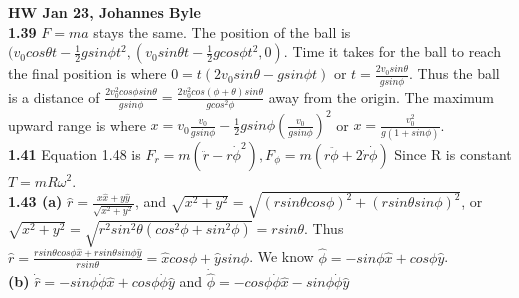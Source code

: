 \documentclass[english]{article}
\begin{document}
\textbf{HW Jan 23, Johannes Byle}\\

\noindent
\textbf{1.39} $F=ma$ stays the same. The position of the ball is $(v_{0}cos\theta t-\frac{1}{2}gsin\phi t^2,(v_{0}sin\theta t-\frac{1}{2}gcos\phi t^2,0)$. Time it takes for the ball to reach the final position is where $0=t(2v_{0}sin\theta-gsin\phi t)$ or $t=\frac{2v_{0}sin\theta}{gsin\phi}$. Thus the ball is a distance of $\frac{2v_0^2cos\phi sin\theta}{gsin\phi}=\frac{2v_0^2cos(\phi+\theta) sin\theta}{gcos^2\phi}$ away from the origin. The maximum upward range is where $x=v_{0}\frac{v_{0}}{gsin\phi}-\frac{1}{2}gsin\phi (\frac{v_{0}}{gsin\phi})^2$ or $x=\frac{v_0^2}{g(1+sin\phi)}$.\\

\textbf{1.41} Equation 1.48 is $F_r=m(\ddot{r}-r\dot{\phi}^2),F_{\phi}=m(r\ddot{\phi}+2\dot{r}\dot{\phi})$ Since R is constant $T=mR\omega^2$.\\

\textbf{1.43 (a)} $\hat{r}=\frac{x\hat{x}+y\hat{y}}{\sqrt{x^2+y^2}}$, and $\sqrt{x^2+y^2}=\sqrt{(rsin\theta cos\phi)^2+(rsin\theta sin\phi)^2}$, or $\sqrt{x^2+y^2}=\sqrt{r^2sin^2\theta(cos^2\phi+sin^2\phi)}=rsin\theta$. Thus $\hat{r}=\frac{rsin\theta cos\phi\hat{x}+rsin\theta sin\phi\hat{y}}{rsin\theta}=\hat{x}cos\phi+\hat{y}sin\phi$. We know $\hat{\phi}=-sin\phi\hat{x}+cos\phi\hat{y}$.\\


\textbf{(b)} $\dot{\hat{r}}=-sin\phi\dot{\phi}\hat{x}+cos\phi\dot{\phi}\hat{y}$ and $\dot{\hat{\phi}}=-cos\phi\dot{\phi}\hat{x}-sin\phi\dot{\phi}\hat{y}$
\end{document}
